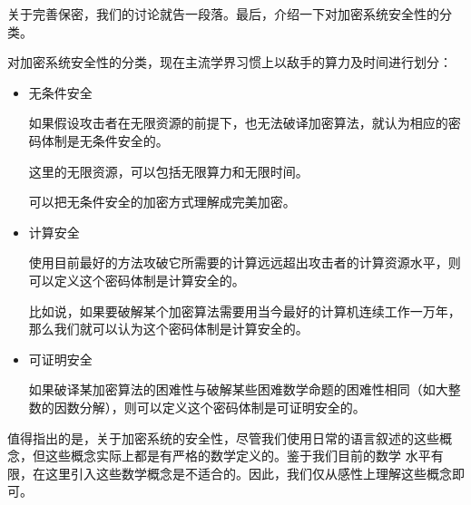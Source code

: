 \documentclass[UTF8]{ctexrep}
\begin{document}
关于完善保密，我们的讨论就告一段落。最后，介绍一下对加密系统安全性的分类。\par
对加密系统安全性的分类，现在主流学界习惯上以敌手的算力及时间进行划分：
\begin{itemize}
    \item 无条件安全\par
        如果假设攻击者在无限资源的前提下，也无法破译加密算法，就认为相应的密码体制是无条件安全的。\par
        这里的无限资源，可以包括无限算力和无限时间。\par
        可以把无条件安全的加密方式理解成完美加密。
    \item 计算安全\par
        使用目前最好的方法攻破它所需要的计算远远超出攻击者的计算资源水平，则可以定义这个密码体制是计算安全的。\par
        比如说，如果要破解某个加密算法需要用当今最好的计算机连续工作一万年，那么我们就可以认为这个密码体制是计算安全的。
    \item 可证明安全\par
        如果破译某加密算法的困难性与破解某些困难数学命题的困难性相同（如大整数的因数分解），则可以定义这个密码体制是可证明安全的。 
\end{itemize}

值得指出的是，关于加密系统的安全性，尽管我们使用日常的语言叙述的这些概念，但这些概念实际上都是有严格的数学定义的。鉴于我们目前的数学 水平有限，在这里引入这些数学概念是不适合的。因此，我们仅从感性上理解这些概念即可。
\end{document}
